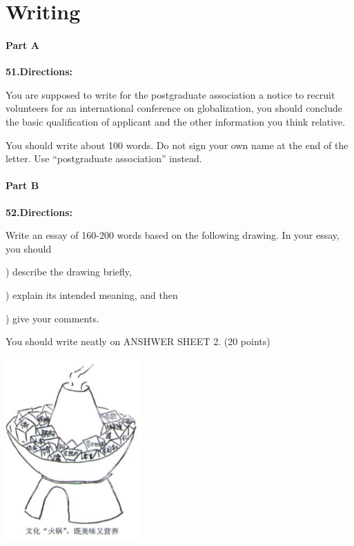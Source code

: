 \section{Writing}
\paragraph{Part A}

\textbf{51.Directions:}

\qquad You are supposed to write for the postgraduate association a notice to recruit volunteers for an international conference on globalization, you should conclude the basic qualification of applicant and the other information you think relative.

\qquad You should write about 100 words. Do not sign your own name at the end of the letter. Use “postgraduate association” instead.

\paragraph{Part B}

\textbf{52.Directions:}

\qquad Write an essay of 160-200 words based on the following drawing. In your essay, you should

) describe the drawing briefly,

) explain its intended meaning, and then

) give your comments.

\qquad You should write neatly on ANSHWER SHEET 2. (20 points)

\begin{center}\includegraphics[height=7cm]{8.jpg}\end{center}